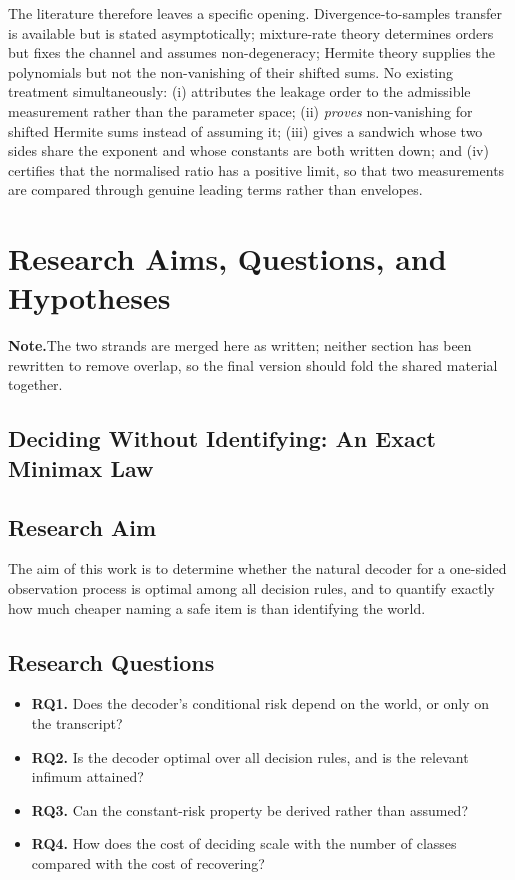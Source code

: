 \documentclass[conference]{IEEEtran}
\theoremstyle{definition}
\newif\ifshownotes\shownotestrue
\newcommand{\NOTEPAR}[1]{\ifshownotes\par\vspace{2pt}\noindent%
  {\color{notecol}\textsf{\footnotesize\textbf{Note.}\;#1}}\par\vspace{2pt}\fi}
\begin{document}
The literature therefore leaves a specific opening. Divergence-to-samples transfer is
available but is stated asymptotically; mixture-rate theory determines orders but fixes the
channel and assumes non-degeneracy; Hermite theory supplies the polynomials but not the
non-vanishing of their shifted sums. No existing treatment simultaneously: (i) attributes
the leakage order to the admissible measurement rather than the parameter space;
(ii) \emph{proves} non-vanishing for shifted Hermite sums instead of assuming it;
(iii) gives a sandwich whose two sides share the exponent and whose constants are both
written down; and (iv) certifies that the normalised ratio has a positive limit, so that two
measurements are compared through genuine leading terms rather than envelopes.


\section{Research Aims, Questions, and Hypotheses}
\NOTEPAR{The two strands are merged here as written; neither section has been rewritten to remove overlap, so the final version should fold the shared material together.}

\subsection{Deciding Without Identifying: An Exact Minimax Law}

\subsection{Research Aim}

The aim of this work is to determine whether the natural decoder for a one-sided observation
process is optimal among all decision rules, and to quantify exactly how much cheaper naming
a safe item is than identifying the world.

\subsection{Research Questions}

\begin{itemize}
\item \textbf{RQ1.} Does the decoder's conditional risk depend on the world, or only on the
transcript?
\item \textbf{RQ2.} Is the decoder optimal over all decision rules, and is the relevant
infimum attained?
\item \textbf{RQ3.} Can the constant-risk property be derived rather than assumed?
\item \textbf{RQ4.} How does the cost of deciding scale with the number of classes compared
with the cost of recovering?
\end{itemize}
\end{document}
